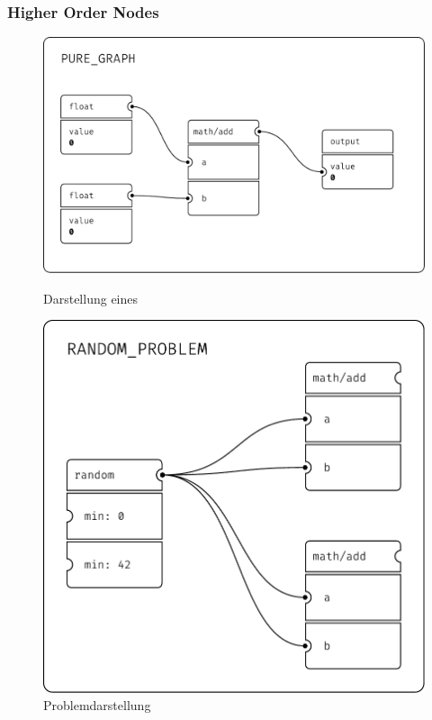 \documentclass[ngerman]{article}
\begin{document}
\subsubsection{Higher Order Nodes}
\label{sec:HON}

\begin{figure}[htbp]
    \centering
    \begin{minipage}[b]{0.45\textwidth}
        \centering
        \includegraphics[width=\textwidth]{graphics/PURE_GRAPH.pdf}
        \caption{Darstellung eines }
        \label{sec:PURE_GRAPH}
    \end{minipage}
    \hfill
    \begin{minipage}[b]{0.45\textwidth}
        \centering
        \includegraphics[width=\textwidth]{graphics/RANDOM_PROBLEM.pdf}
        \caption{Problemdarstellung}
        \label{fig:problem}
    \end{minipage}
\end{figure}
\end{document}
